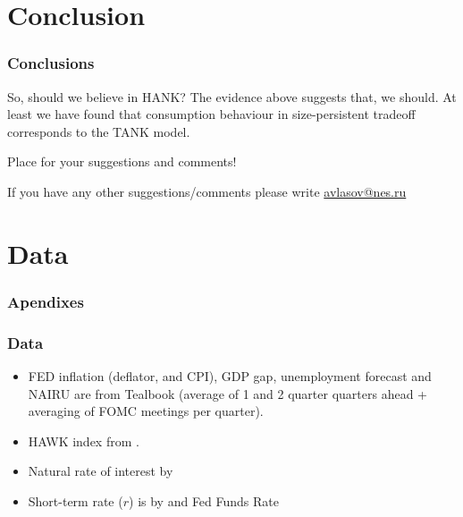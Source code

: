 \documentclass[11pt,pdf,aspectratio=129]{beamer}
\begin{document}
\section{Conclusion}
\begin{frame}\frametitle{Conclusions}
    \begin{block}{So, should we believe in HANK?}
        The evidence above suggests that, we should. 
        At least we have found that consumption behaviour in size-persistent tradeoff corresponds to the TANK model.
    \end{block}
\end{frame}





\begin{frame}

\begin{center}
    \Large Place for your suggestions and comments!
\end{center} 
\begin{center}
    \footnotesize
If you have any other suggestions/comments  please write \href{mailto://avlasov@nes.ru}{avlasov@nes.ru}
\end{center}


\end{frame}





\appendix
\section{Data}

\begin{frame}
    \frametitle{Apendixes}
    \tableofcontents[currentsection]
\end{frame}

\begin{frame}\frametitle{Data}
    \begin{itemize}\setlength\itemsep{1em}
        \item FED inflation (deflator, and CPI), GDP gap, unemployment forecast and NAIRU are from Tealbook (average of 1 and 2 quarter quarters ahead + averaging of FOMC meetings per quarter).
        \item HAWK index from \citet{HIM2023}.
        \item Natural rate of interest by \citet{HLW2017,HLW2023}
        \item Short-term rate ($r$) is by \citet{WuXia2016} and Fed Funds Rate 
        \end{itemize}
    \end{frame}
\end{document}

